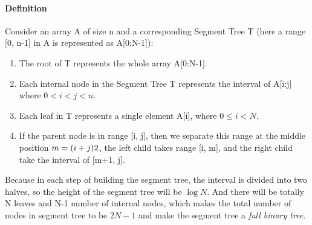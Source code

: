 \documentclass[../main.tex]{subfiles}
\begin{document}
\paragraph{Definition} Consider an array A of size n and a corresponding Segment Tree T (here a range [0, n-1] in A is represented as A[0:N-1]):
\begin{enumerate}
    \item The root of T represents the whole array A[0:N-1]. 
    \item Each internal node in the Segment Tree T represents the interval of A[i:j] where $0 < i < j < n$. 
    \item Each leaf in T represents a single element A[i], where $0 \leq i<N$. 
    \item If the parent node is in range [i, j], then we separate this range at the middle position $m = (i+j)\/\/2$, the left child takes range [i, m], and the right child take the interval of [m+1, j].
\end{enumerate}

Because in each step of building the segment tree, the interval is divided into two halves, so the height of the segment tree will be $\log N$. And there will be totally N leaves and N-1 number of internal nodes, which makes the total number of nodes in segment tree to be $2N-1$ and make the segment tree a \textit{full binary tree}.
\end{document}
